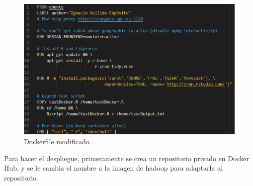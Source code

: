\begin{figure}[H]\center\includegraphics[width=.95\linewidth]{img/r/r11.png}\caption{Dockerfile modificado.}\end{figure}

Para hacer el despliegue, primeramente se crea un repositorio privado en Docker Hub, y se le cambia el nombre a la imagen de hadoop para adaptarla al repositorio.

